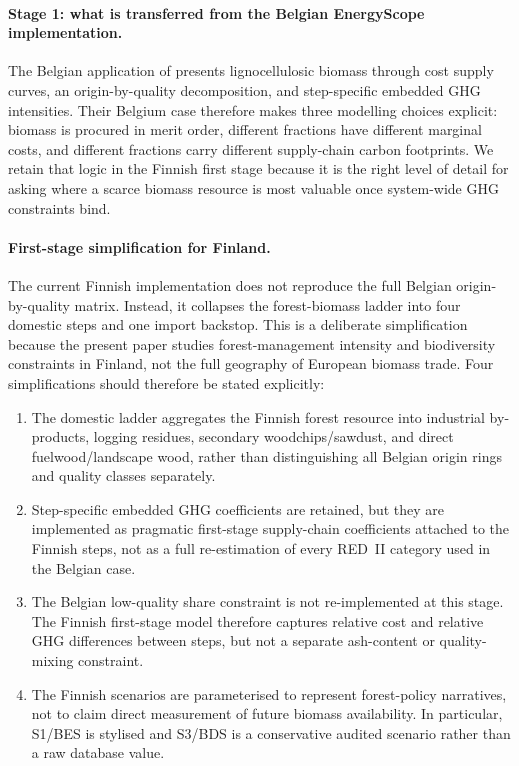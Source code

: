 \documentclass{article}
\begin{document}
\paragraph{Stage 1: what is transferred from the Belgian EnergyScope implementation.}
The Belgian application of \citet{collaOptimalUseLignocellulosic2022} presents lignocellulosic biomass through cost supply curves, an origin-by-quality decomposition, and step-specific embedded GHG intensities. Their Belgium case therefore makes three modelling choices explicit: biomass is procured in merit order, different fractions have different marginal costs, and different fractions carry different supply-chain carbon footprints. We retain that logic in the Finnish first stage because it is the right level of detail for asking where a scarce biomass resource is most valuable once system-wide GHG constraints bind.

\paragraph{First-stage simplification for Finland.}
The current Finnish implementation does not reproduce the full Belgian origin-by-quality matrix. Instead, it collapses the forest-biomass ladder into four domestic steps and one import backstop. This is a deliberate simplification because the present paper studies forest-management intensity and biodiversity constraints in Finland, not the full geography of European biomass trade. Four simplifications should therefore be stated explicitly:
\begin{enumerate}
  \item The domestic ladder aggregates the Finnish forest resource into industrial by-products, logging residues, secondary woodchips/sawdust, and direct fuelwood/landscape wood, rather than distinguishing all Belgian origin rings and quality classes separately.
  \item Step-specific embedded GHG coefficients are retained, but they are implemented as pragmatic first-stage supply-chain coefficients attached to the Finnish steps, not as a full re-estimation of every RED~II category used in the Belgian case.
  \item The Belgian low-quality share constraint is not re-implemented at this stage. The Finnish first-stage model therefore captures relative cost and relative GHG differences between steps, but not a separate ash-content or quality-mixing constraint.
  \item The Finnish scenarios are parameterised to represent forest-policy narratives, not to claim direct measurement of future biomass availability. In particular, S1/BES is stylised and S3/BDS is a conservative audited scenario rather than a raw database value.
\end{enumerate}
\end{document}

